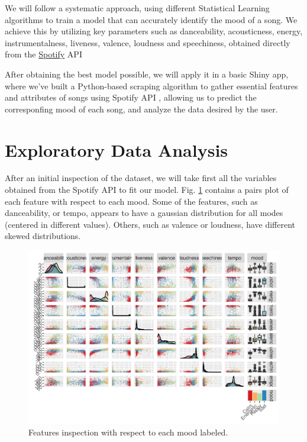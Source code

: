 \documentclass[11pt,]{article}
\begin{document}
We will follow a systematic approach, using different Statistical
Learning algorithms to train a model that can accurately identify the
mood of a song. We achieve this by utilizing key parameters such as
danceability, acousticness, energy, instrumentalness, liveness, valence,
loudness and speechiness, obtained directly from the
\href{https://open.spotify.com/intl-es}{Spotify} API
\citep{spotifydeveloper}

After obtaining the best model possible, we will apply it in a basic
Shiny app, where we've built a Python-based scraping algorithm to gather
essential features and attributes of songs using Spotify API
\citep{spotifydeveloper}, allowing us to predict the corresponfing mood
of each song, and analyze the data desired by the user.

\hypertarget{exploratory-data-analysis}{%
\section{Exploratory Data Analysis}\label{exploratory-data-analysis}}

After an initial inspection of the dataset, we will take first all the
variables obtained from the Spotify API to fit our model. Fig.
\ref{fig:features} contains a pairs plot of each feature with respect to
each mood. Some of the features, such as danceability, or tempo, appears
to have a gaussian distribution for all modes (centered in different
values). Others, such as valence or loudness, have different skewed
distributions.

\begin{figure}[H]
\includegraphics{figs/features} \caption{Features inspection with respect to each mood labeled.}\label{fig:features}
\end{figure}
\end{document}
